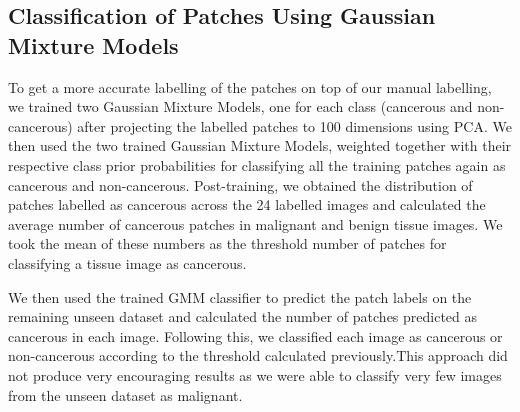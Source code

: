 \subsection{Classification of Patches Using Gaussian Mixture Models}
To get a more accurate labelling of the patches on top of our manual labelling, we trained two Gaussian Mixture Models, one for each class (cancerous and non-cancerous) after projecting the labelled patches to 100 dimensions using PCA. We then used the two trained Gaussian Mixture Models, weighted together with their respective class prior probabilities for classifying all the training patches again as cancerous and non-cancerous. Post-training, we obtained the distribution of patches labelled as cancerous across the 24 labelled images and calculated the average number of cancerous patches in malignant and benign tissue images. We took the mean of these numbers as the threshold number of patches for classifying a tissue image as cancerous.

We then used the trained GMM classifier to predict the patch labels on the remaining unseen dataset and calculated the number of patches predicted as cancerous in each image. Following this, we classified each image as cancerous or non-cancerous according to the threshold calculated previously.This approach did not produce very encouraging results as we were able to classify very few images from the unseen dataset as malignant. 



 

